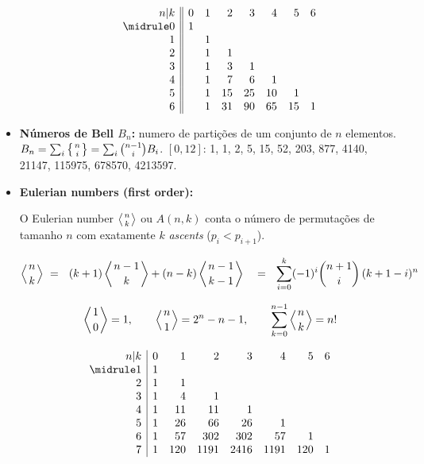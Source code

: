 \begin{small}
\begin{itemize}
\begin{itemize}
        \[\begin{array}{r||rrrrrrr}
        n|k & 0 & 1 & 2 & 3 & 4 & 5 & 6 \\\midrule
        0 & 1 &   &   &   &   &   &     \\
        1 &   & 1 &   &   &   &   &     \\
        2 &   & 1 & 1 &   &   &   &     \\
        3 &   & 1 & 3 & 1 &   &   &     \\
        4 &   & 1 & 7 & 6 & 1 &   &     \\
        5 &   & 1 & 15 & 25 & 10 & 1 &   \\
        6 &   & 1 & 31 & 90 & 65 & 15 & 1 \\
        \end{array}\]

    \end{itemize}

    \item \textbf{Números de Bell $B_n$:} numero de partições de um conjunto de $n$ elementos. $ B_n =  \sum_{i} \left\{{n \atop i}\right\}  = \sum_{i} \binom{n-1} {i} B_i $. 
$[0,12]$: 1, 1, 2, 5, 15, 52, 203, 877, 4140, 21147, 115975, 678570, 4213597.


\item \textbf{Eulerian numbers (first order):}

O Eulerian number $\left\langle{n\atop k}\right\rangle$ ou $A(n,k)$ conta o número de permutações de tamanho $n$ com exatamente $k$ \emph{ascents} ($p_i<p_{i+1}$).

\[ 
\left\langle{n\atop k}\right\rangle 
\ = \ \ 
(k+1) \left\langle{n-1\atop k}\right\rangle  +  (n-k)\left\langle{n-1\atop k-1}\right\rangle 
\ \ \ =\ \ 
\sum_{i=0}^{k} (-1)^i \binom{n+1}{i}\,(k+1-i)^n
\]

\[
\left\langle{1\atop 0}\right\rangle = 1 
, \qquad 
\left\langle{n \atop 1}\right\rangle = 2^n - n - 1 
, \qquad 
\sum_{k=0}^{n-1} \left\langle{n\atop k}\right\rangle = n!
 \]


\[
\begin{array}{r|rrrrrrr}
n|k & 0 & 1 & 2 & 3 & 4 & 5 & 6\\\midrule
1 & 1 & & & & & & \\
2 & 1 & 1 & & & & & \\
3 & 1 & 4 & 1 & & & & \\
4 & 1 & 11 & 11 & 1 & & & \\
5 & 1 & 26 & 66 & 26 & 1 & & \\
6 & 1 & 57 & 302 & 302 & 57 & 1 & \\
7 & 1 & 120 & 1191 & 2416 & 1191 & 120 & 1\\
\end{array}
\]



\end{itemize}
\end{small}
